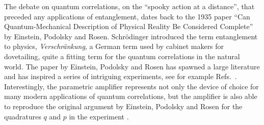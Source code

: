 \documentclass[12pt,amsmath,amssymb]{article}
\numberwithin{equation}{section}
\begin{document}
The debate on quantum correlations, on the
``spooky action at a distance'', that preceded any applications
of entanglement, dates back to the 1935 paper \cite{EPR}
``Can Quantum-Mechanical Description of Physical Reality
Be Considered Complete'' by Einstein, Podolsky and Rosen.
Schr\"odinger \cite{Schroedinger}
introduced the term entanglement to physics,
{\it Verschr\"ankung}, a German term used by
cabinet makers for dovetailing, quite a fitting term for the
quantum correlations in the natural world.
The paper \cite{EPR} by Einstein, Podolsky and Rosen
has spawned a large literature \cite{Mermin}
and has inspired a series of intriguing experiments,
see for example Refs.\
\cite{Aspect,Boschi,Bouwmeester,BEZ,Ou1,Ou2,Tittel,Weihs}.
Interestingly, the parametric amplifier represents not only
the device of choice for many modern applications of
quantum correlations, but the amplifier is also able
to reproduce the original argument
by Einstein, Podolsky and Rosen
for the quadratures $q$ and $p$
\cite{Reid} in the experiment \cite{Ou1,Ou2}.
\end{document}
